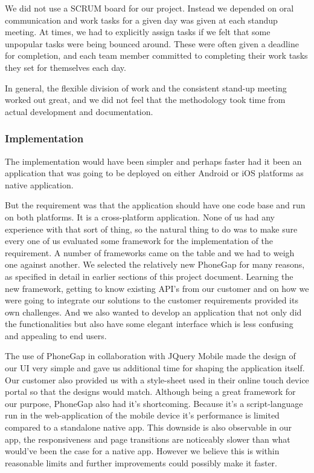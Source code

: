 We did not use a SCRUM board for our project. Instead we depended on oral 
communication and work tasks for a given day was given at each standup meeting.
At times, we had to explicitly assign tasks if we felt that some
unpopular tasks were being bounced around. These were often given a deadline for
completion, and each team member committed to completing their work tasks they
set for themselves each day.

In general, the flexible division of work and the consistent stand-up meeting
worked out great, and we did not feel that the methodology took time from actual
development and documentation. 

	\subsubsection{Implementation}
The implementation would have been simpler and perhaps faster had it been an
application that was going to be deployed on either Android or iOS platforms as
native application.

But the requirement was that the application should have one code base and run
on both platforms.
It is a cross-platform application.
None of us had any experience with that sort of thing, so the natural thing to
do was to make sure every one of us evaluated some framework for the
implementation of the requirement.
A number of frameworks came on the table and we had to weigh one against another.
We selected the relatively new PhoneGap for many reasons, as specified in detail
in earlier sections of this project document.
Learning the new framework, getting to know existing API's from our customer and
on how we were going to integrate our solutions to the customer requirements
provided its own challenges.
And we also wanted to develop an application that not only did the
functionalities but also have some elegant interface which is less confusing and
appealing to end users.

The use of PhoneGap in collaboration with JQuery Mobile made the design of our
UI very simple and gave us additional time for shaping the application itself.
Our customer also provided us with a style-sheet used in their online touch
device portal so that the designs would match.  Although being a great framework
for our purpose, PhoneGap also had it's shortcoming.  Because it's a
script-language run in the web-application of the mobile device it's performance
is limited compared to a standalone native app.  This downside is also
observable in our app, the responsiveness and page transitions are noticeably
slower than what would've been the case for a native app.  However we believe
this is within reasonable limits and further improvements could possibly make it
faster.

